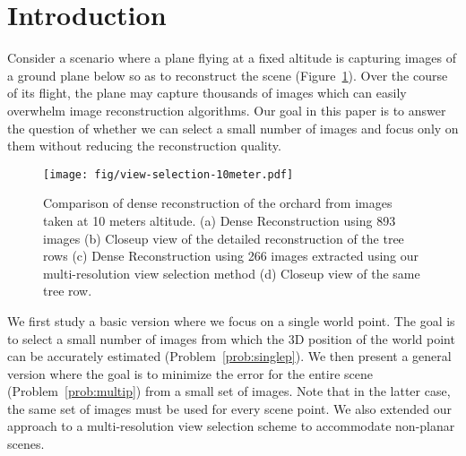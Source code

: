 \section{Introduction}
Consider a scenario
where a plane flying at a fixed altitude is capturing images of a
ground plane below so as to reconstruct the scene (Figure~\ref{fig:denseComp10}).  Over the
course of its flight, the plane may capture thousands of
images which can easily overwhelm image reconstruction algorithms.
Our goal in this paper is to answer the question of whether we can select a
small number of images and focus only on them without reducing the
reconstruction quality. 


\begin{figure}
\centering
	\texttt{[image: fig/view-selection-10meter.pdf]}
	\caption{Comparison of dense reconstruction of the orchard from images taken at 10 meters altitude. (a) Dense Reconstruction using 893 images (b) Closeup view of the detailed reconstruction of the tree rows (c) Dense Reconstruction using 266 images extracted using our multi-resolution view selection method (d) Closeup view of the same tree row. }
\label{fig:denseComp10}
\end{figure} 

We first study a basic version where we focus on a single world point.
The goal is to select a small number of images from which the 3D
position of the world point can be accurately estimated
(Problem~\ref{prob:singlep}).  We then present a general version where
the goal is to minimize the error for the entire scene
(Problem~\ref{prob:multip}) from a small set of images. Note that in
the latter case, the same set of images must be used for every scene
point. We also extended our approach to a multi-resolution view selection 
scheme to accommodate non-planar scenes. 

